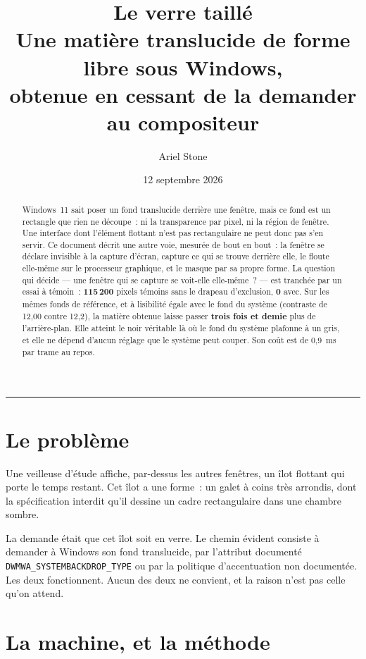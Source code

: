\documentclass[11pt,a4paper]{article}
\title{\textbf{Le verre taillé}\\[0.3em]
\large Une matière translucide de forme libre sous Windows,\\
obtenue en cessant de la demander au compositeur}
\author{Ariel Stone}
\date{12 septembre 2026}
\newcommand{\uni}[1]{\texttt{#1}}
\newcommand{\np}[1]{#1}
\begin{document}
\maketitle

\begin{abstract}
\noindent
Windows~11 sait poser un fond translucide derrière une fenêtre, mais ce fond
est un rectangle que rien ne découpe~: ni la transparence par pixel, ni la
région de fenêtre. Une interface dont l'élément flottant n'est pas
rectangulaire ne peut donc pas s'en servir. Ce document décrit une autre voie,
mesurée de bout en bout~: la fenêtre se déclare invisible à la capture d'écran,
capture ce qui se trouve derrière elle, le floute elle-même sur le processeur
graphique, et le masque par sa propre forme. La question qui décide — une
fenêtre qui se capture se voit-elle elle-même~? — est tranchée par un essai à
témoin~: \textbf{115\,200} pixels témoins sans le drapeau d'exclusion,
\textbf{0} avec. Sur les mêmes fonds de référence, et à lisibilité égale avec
le fond du système (contraste de \np{12,00} contre \np{12,2}), la matière
obtenue laisse passer \textbf{trois fois et demie} plus de l'arrière-plan. Elle
atteint le noir véritable là où le fond du système plafonne à un gris, et elle
ne dépend d'aucun réglage que le système peut couper. Son coût est de
\np{0,9}~ms par trame au repos.
\end{abstract}

\tableofcontents
\bigskip
\hrule

\section{Le problème}

Une veilleuse d'étude affiche, par-dessus les autres fenêtres, un îlot
flottant qui porte le temps restant. Cet îlot a une forme~: un galet à coins
très arrondis, dont la spécification interdit qu'il dessine un cadre
rectangulaire dans une chambre sombre.

La demande était que cet îlot soit en verre. Le chemin évident consiste à
demander à Windows son fond translucide, par l'attribut documenté
\uni{DWMWA\_SYSTEMBACKDROP\_TYPE} ou par la politique d'accentuation non
documentée. Les deux fonctionnent. Aucun des deux ne convient, et la raison
n'est pas celle qu'on attend.

\section{La machine, et la méthode}
\end{document}
